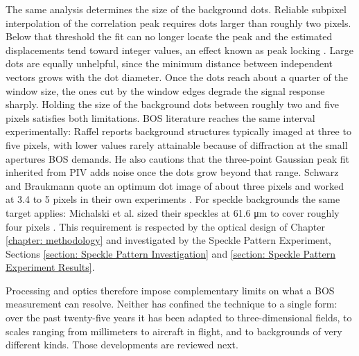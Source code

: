 \par The same analysis determines the size of the background dots. Reliable subpixel interpolation of the correlation peak requires dots larger than roughly two pixels. Below that threshold the fit can no longer locate the peak and the estimated displacements tend toward integer values, an effect known as peak locking \cite{KahlerEtAl}. Large dots are equally unhelpful, since the minimum distance between independent vectors grows with the dot diameter. Once the dots reach about a quarter of the window size, the ones cut by the window edges degrade the signal response sharply. Holding the size of the background dots between roughly two and five pixels satisfies both limitations. BOS literature reaches the same interval experimentally: Raffel \cite{Raffel2015} reports background structures typically imaged at three to five pixels, with lower values rarely attainable because of diffraction at the small apertures BOS demands. He also cautions that the three-point Gaussian peak fit inherited from PIV adds noise once the dots grow beyond that range. Schwarz and Braukmann quote an optimum dot image of about three pixels and worked at 3.4 to 5 pixels in their own experiments \cite{Schwarz&Braukmann}. For speckle backgrounds the same target applies: Michalski et al. sized their speckles at 61.6 \si{\micro\metre} to cover roughly four pixels \cite{Michalski2018}. This requirement is respected by the optical design of Chapter \ref{chapter: methodology} and investigated by the Speckle Pattern Experiment, Sections \ref{section: Speckle Pattern Investigation} and \ref{section: Speckle Pattern Experiment Results}.

\par Processing and optics therefore impose complementary limits on what a BOS measurement can resolve. Neither has confined the technique to a single form: over the past twenty-five years it has been adapted to three-dimensional fields, to scales ranging from millimeters to aircraft in flight, and to backgrounds of very different kinds. Those developments are reviewed next.

